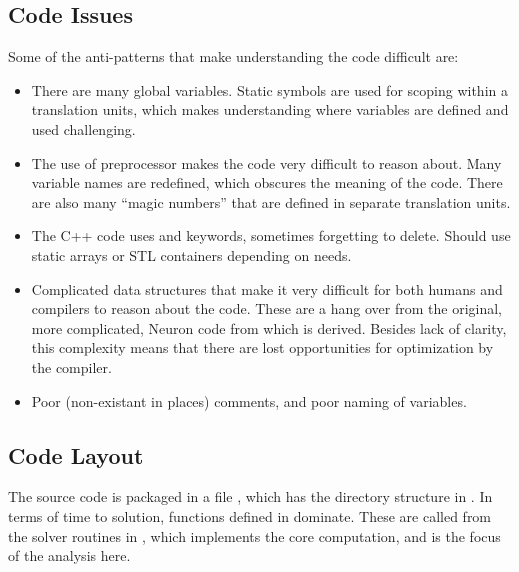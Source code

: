 \subsection{Code Issues}
Some of the anti-patterns that make understanding the code difficult are:
\begin{itemize}
    \item
        There are many global variables. Static symbols are used for scoping within a translation units, which makes understanding where variables are defined and used challenging.
    \item
        The use of preprocessor  makes the code very difficult to reason about. Many variable names are redefined, which obscures the meaning of the code. There are also many ``magic numbers'' that are defined in separate translation units.
    \item
        The C++ code uses  and  keywords, sometimes forgetting to delete. Should use static arrays or STL containers depending on needs.
    \item
        Complicated data structures that make it very difficult for both humans and compilers to reason about the code. These are a hang over from the original, more complicated, Neuron code from which \neuron is derived. Besides lack of clarity, this complexity means that there are lost opportunities for optimization by the compiler.
    \item
        Poor (non-existant in places) comments, and poor naming of variables.
\end{itemize}

\subsection{Code Layout}
The source code is packaged in a file , which has the directory structure in .
In terms of time to solution, functions defined in  dominate. These are called from the solver routines in , which implements the core computation, and is the focus of the analysis here.

